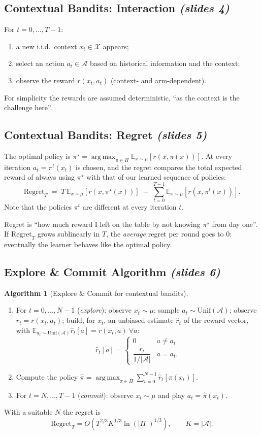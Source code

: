 \documentclass[11pt,a4paper]{article}
\newcommand{\E}{\mathbb{E}}
\DeclareMathOperator*{\argmax}{arg\,max}
\newcommand{\slr}[1]{\texorpdfstring{\emph{(slides #1)}}{(slides #1)}}
\newcommand{\cA}{\mathcal{A}}
\theoremstyle{plain}
\theoremstyle{definition}
\newtheorem{algorithm}[theorem]{Algorithm}
\theoremstyle{remark}
\begin{document}
\subsection{Contextual Bandits: Interaction \slr{4}}
For $t=0,\dots,T-1$:
\begin{enumerate}[nosep]
  \item a new i.i.d.\ context $x_t\in\mathcal X$ appears;
  \item select an action $a_t\in\cA$ based on historical information and the context;
  \item observe the reward $r(x_t,a_t)$ (context- and arm-dependent).
\end{enumerate}
For simplicity the rewards are assumed deterministic, ``as the context is the challenge here''.

\subsection{Contextual Bandits: Regret \slr{5}}
The optimal policy is $\pi^\star=\argmax_{\pi\in\Pi}\E_{x\sim\mu}[r(x,\pi(x))]$. At every iteration $a_t=\pi^t(x_t)$ is chosen, and the regret compares the total expected reward of always using $\pi^\star$ with that of our learned sequence of policies:
\[
  \mathrm{Regret}_T \;=\; T\,\E_{x\sim\mu}\!\left[r(x,\pi^\star(x))\right]\;-\;\sum_{t=0}^{T-1}\E_{x\sim\mu}\!\left[r(x,\pi^t(x))\right].
\]
Note that the policies $\pi^t$ are different at every iteration $t$.

\begin{intuition}
Regret is ``how much reward I left on the table by not knowing $\pi^\star$ from day one''. If $\mathrm{Regret}_T$ grows sublinearly in $T$, the \emph{average} regret per round goes to $0$: eventually the learner behaves like the optimal policy.
\end{intuition}

\subsection{Explore \& Commit Algorithm \slr{6}}
\begin{algorithm}[Explore \& Commit for contextual bandits]
\begin{enumerate}[nosep]
  \item For $t=0,\dots,N-1$ (\emph{explore}): observe $x_t\sim\mu$; sample $a_t\sim\mathrm{Unif}(\cA)$; observe $r_t=r(x_t,a_t)$; build, for $x_t$, an unbiased estimate $\hat r_t$ of the reward vector, with $\E_{a_t\sim\mathrm{Unif}(\cA)}\hat r_t[a]=r(x_t,a)\ \forall a$:
  \[
   \hat r_t[a]=\begin{cases}0 & a\neq a_t\\[2pt] \dfrac{r_t}{1/|\cA|} & a=a_t.\end{cases}
  \]
  \item Compute the policy $\hat\pi=\argmax_{\pi\in\Pi}\sum_{t=0}^{N-1}\hat r_t[\pi(x_t)]$.
  \item For $t=N,\dots,T-1$ (\emph{commit}): observe $x_t\sim\mu$ and play $a_t=\hat\pi(x_t)$.
\end{enumerate}
\end{algorithm}
With a suitable $N$ the regret is
\[
  \mathrm{Regret}_T=O\!\left(T^{2/3}K^{1/3}\ln(|\Pi|)^{1/3}\right),\qquad K=|\cA|.
\]
\end{document}
